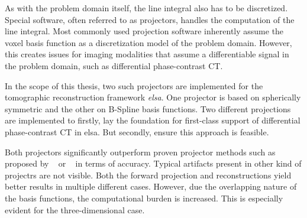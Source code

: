 As with the problem domain itself, the line integral also has to be discretized. Special software,
often referred to as projectors, handles the computation of the line integral. Most commonly used
projection software inherently assume the voxel basis function as a discretization model of the
problem domain. However, this creates issues for imaging modalities that assume a differentiable
signal in the problem domain, such as differential phase-contrast CT\@.

In the scope of this thesis, two such projectors are implemented for the tomographic reconstruction
framework \textit{elsa}. One projector is based on spherically symmetric and the other on B-Spline
basis functions. Two different projections are implemented to firstly, lay the foundation for
first-class support of differential phase-contrast CT in elsa. But secondly, ensure this approach is
feasible.

Both projectors significantly outperform proven projector methods such as proposed by
\citeauthor*{siddon_fast_1985}~\cite{siddon_fast_1985} or
\citeauthor*{joseph_improved_1982}~\cite{joseph_improved_1982} in terms of accuracy. Typical
artifacts present in other kind of projectrs are not visible. Both the forward projection and
reconstructions yield better results in multiple different cases. However, due the overlapping
nature of the basis functions, the computational burden is increased. This is especially evident for
the three-dimensional case.
